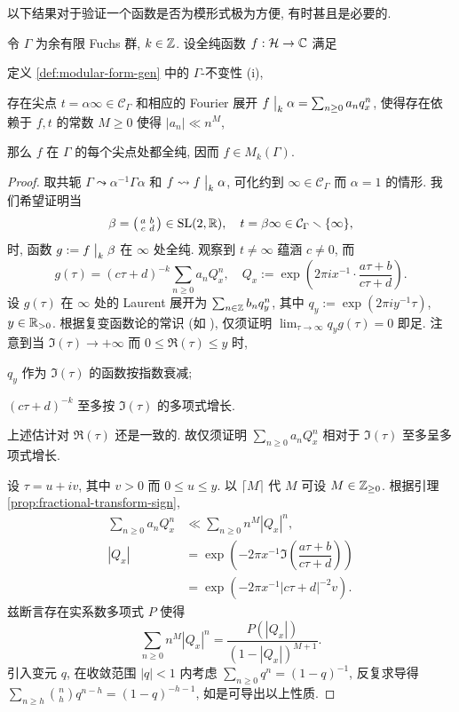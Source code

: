 以下结果对于验证一个函数是否为模形式极为方便, 有时甚且是必要的.
\begin{proposition}\label{prop:automatic-holomorphy}
	令 $\Gamma$ 为余有限 Fuchs 群, $k \in \mathbb{Z}$. 设全纯函数 $f: \mathcal{H} \to \mathbb{C}$ 满足
	\begin{compactitem}
		\item 定义 \ref{def:modular-form-gen} 中的 $\Gamma$-不变性 (i),
		\item 存在尖点 $t = \alpha\infty \in \mathcal{C}_\Gamma$ 和相应的 Fourier 展开 $f \;\big|_{k} \; \alpha = \sum_{n \geq 0} a_n q_x^n$, 使得存在依赖于 $f, t$ 的常数 $M \geq 0$ 使得 $|a_n| \ll n^M$,
	\end{compactitem}
	那么 $f$ 在 $\Gamma$ 的每个尖点处都全纯, 因而 $f \in M_k(\Gamma)$.
\end{proposition}
\begin{proof}
	取共轭 $\Gamma \leadsto \alpha^{-1}\Gamma \alpha$ 和 $f \leadsto f \;\big|_{k} \; \alpha$, 可化约到 $\infty \in \mathcal{C}_\Gamma$ 而 $\alpha = 1$ 的情形. 我们希望证明当
	\[ \beta = \bigl(\begin{smallmatrix} a & b \\ c & d \end{smallmatrix}\bigr) \in \operatorname{SL}(2,\mathbb{R}), \quad t = \beta\infty \in \mathcal{C}_\Gamma \smallsetminus \{\infty\}, \]
	时, 函数 $g := f \;\big|_{k} \; \beta$ 在 $\infty$ 处全纯. 观察到 $t \neq \infty$ 蕴涵 $c \neq 0$, 而
	\[ g(\tau) = (c\tau + d)^{-k} \sum_{n \geq 0} a_n Q_x^n, \quad Q_x := \exp\left(2 \pi ix^{-1} \cdot \dfrac{a\tau + b}{c\tau + d} \right). \]
	设 $g(\tau)$ 在 $\infty$ 处的 Laurent 展开为 $\sum_{n \in \mathbb{Z}} b_n q_y^n$, 其中 $q_y := \exp(2\pi i y^{-1} \tau)$, $y \in \mathbb{R}_{>0}$. 根据复变函数论的常识 (如 \cite[\S 4.2, 定理 1]{TW06}), 仅须证明 $\lim_{\tau \to \infty} q_y g(\tau) = 0$ 即足. 注意到当 $\Im(\tau) \to +\infty$ 而 $0 \leq \Re(\tau) \leq y$ 时,
	\begin{compactitem}
		\item $q_y$ 作为 $\Im(\tau)$ 的函数按指数衰减;
		\item $(c\tau + d)^{-k}$ 至多按 $\Im(\tau)$ 的多项式增长.
	\end{compactitem}
	上述估计对 $\Re(\tau)$ 还是一致的. 故仅须证明 $\sum_{n \geq 0} a_n Q_x^n$ 相对于 $\Im(\tau)$ 至多呈多项式增长.
	
	设 $\tau = u + iv$, 其中 $v > 0$ 而 $0 \leq u \leq y$. 以 $\lceil M \rceil$ 代 $M$ 可设 $M \in \mathbb{Z}_{\geq 0}$. 根据引理 \ref{prop:fractional-transform-sign},
	\begin{align*}
		\sum_{n \geq 0} a_n Q_x^n & \ll \sum_{n \geq 0} n^M |Q_x|^n, \\
		|Q_x| & = \exp\left( -2\pi x^{-1} \Im\left(\dfrac{a\tau+b}{c\tau+d}\right) \right) \\
		& = \exp\left( -2\pi x^{-1} |c\tau + d|^{-2} v \right).
	\end{align*}
	兹断言存在实系数多项式 $P$ 使得
	\[ \sum_{n \geq 0} n^M |Q_x|^n = \dfrac{P(|Q_x|)}{(1 - |Q_x|)^{M+1}}. \]
	引入变元 $q$, 在收敛范围 $|q|<1$ 内考虑 $\sum_{n \geq 0} q^n = (1-q)^{-1}$, 反复求导得 $\sum_{n \geq h} \binom{n}{h} q^{n-h} = (1-q)^{-h-1}$, 如是可导出以上性质.
	

\end{proof}
